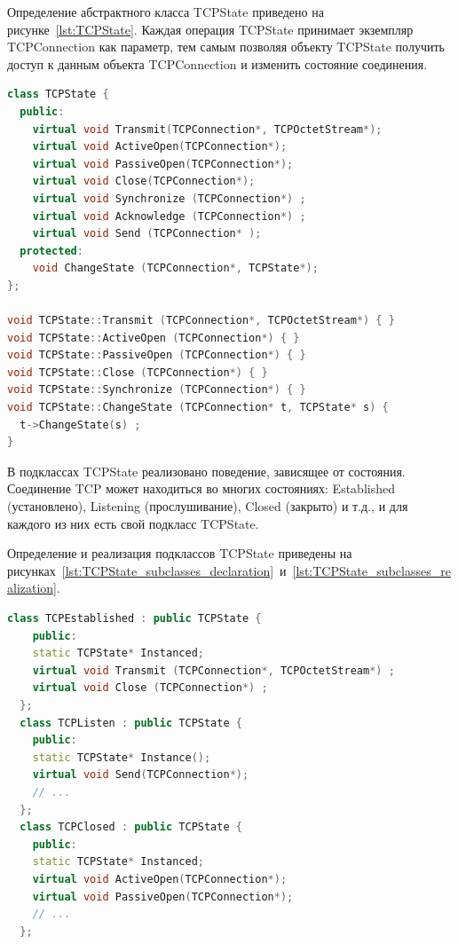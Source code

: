 Определение абстрактного класса TCPState
приведено на рисунке~\ref{lst:TCPState}.
Каждая операция TCPState принимает экземпляр TCPConnection как параметр,
тем самым позволяя объекту TCPState
получить доступ к данным объекта TCPConnection и изменить состояние соединения.

\begin{lstlisting}[language=c++,caption=Класс TCPState,label=lst:TCPState]
class TCPState {
  public:
    virtual void Transmit(TCPConnection*, TCPOctetStream*);
    virtual void ActiveOpen(TCPConnection*);
    virtual void PassiveOpen(TCPConnection*);
    virtual void Close(TCPConnection*);
    virtual void Synchronize (TCPConnection*) ;
    virtual void Acknowledge (TCPConnection*) ;
    virtual void Send (TCPConnection* );
  protected:
    void ChangeState (TCPConnection*, TCPState*);
};

void TCPState::Transmit (TCPConnection*, TCPOctetStream*) { }
void TCPState::ActiveOpen (TCPConnection*) { }
void TCPState::PassiveOpen (TCPConnection*) { }
void TCPState::Close (TCPConnection*) { }
void TCPState::Synchronize (TCPConnection*) { }
void TCPState::ChangeState (TCPConnection* t, TCPState* s) {
  t->ChangeState(s) ;
}
\end{lstlisting}

В подклассах TCPState реализовано поведение, зависящее от состояния.
Соединение TCP может находиться во многих состояниях:
Established (установлено), Listening (прослушивание), Closed (закрыто) и т.д.,
и для каждого из них есть свой подкласс TCPState.

Определение и реализация подклассов TCPState приведены на рисунках~\ref{lst:TCPState_subclasses_declaration}~и~\ref{lst:TCPState_subclasses_realization}.

\begin{lstlisting}[language=c++,caption=Подклассы TCPState,label=lst:TCPState_subclasses_declaration]
  class TCPEstablished : public TCPState {
    public:
    static TCPState* Instanced;
    virtual void Transmit (TCPConnection*, TCPOctetStream*) ;
    virtual void Close (TCPConnection*) ;
  };
  class TCPListen : public TCPState {
    public:
    static TCPState* Instance();
    virtual void Send(TCPConnection*);
    // ...
  };
  class TCPClosed : public TCPState {
    public:
    static TCPState* Instanced;
    virtual void ActiveOpen(TCPConnection*);
    virtual void PassiveOpen(TCPConnection*);
    // ...
  };
\end{lstlisting}

